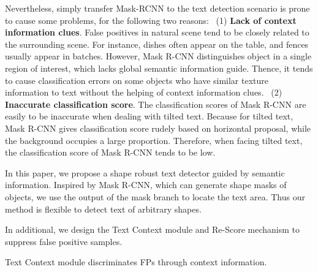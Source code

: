 \documentclass[letterpaper]{article} \usepackage{aaai19}  \usepackage{times}  \usepackage{helvet}  \usepackage{courier}  \usepackage{url}  \usepackage{graphicx}
\begin{document}
\iffalse
However, this brings a drawback when dealing with text, for text in natural scene tends to have similar texture information to many other objects.
For example, Mask R-CNN distinguish object in a single window, it lacks semantic information and tends to cause classification errors for some objects which are similar to text. 
False positive in natural scenes tend to be closely related to the surrounding scenes. For instance, dishes often appear on the table, and fences usually appear in batches. Hence, learning contextual semantic information helps to discriminate text/non-text better.
Moreover, Mask R-CNN tells whether it is text by horizontal proposal classification and returns a classification confidence.
This leads to tilted text tends to have lower scores than horizontal text because in a horizontal proposal surrounded by titled text, the background occupies a large proportion.
\fi

Nevertheless, simply transfer Mask-RCNN to the text detection scenario is prone to cause some problems, for the following two reasons:
~(1) \textbf{Lack of context information clues}. 
False positives in natural scene tend to be closely related to the surrounding scene. 
For instance, dishes often appear on the table, and fences usually appear in batches.  
However, Mask R-CNN distinguishes object in a single region of interest, which lacks global semantic information guide. Thence, it tends to cause classification errors on some objects who have similar texture information to text without the helping of context information clues. 
~(2) \textbf{Inaccurate classification score}.
The classification scores of Mask R-CNN are easily to be inaccurate when dealing with tilted text. 
Because for tilted text, Mask R-CNN gives classification score rudely based on horizontal proposal, while the background occupies a large proportion. Therefore, when facing tilted text, the classification score of Mask R-CNN tends to be low.


In this paper, we propose a shape robust text detector guided by semantic information. 
Inspired by Mask R-CNN, which can generate shape masks of objects, we use the output of the mask branch to locate the text area. Thus our method is flexible to detect text of arbitrary shapes.

\iffalse
In additional, we design the Text Context module and Re-Score mechanism to suppress false positive samples.

Text Context module discriminates FPs through context information.
\end{document}
